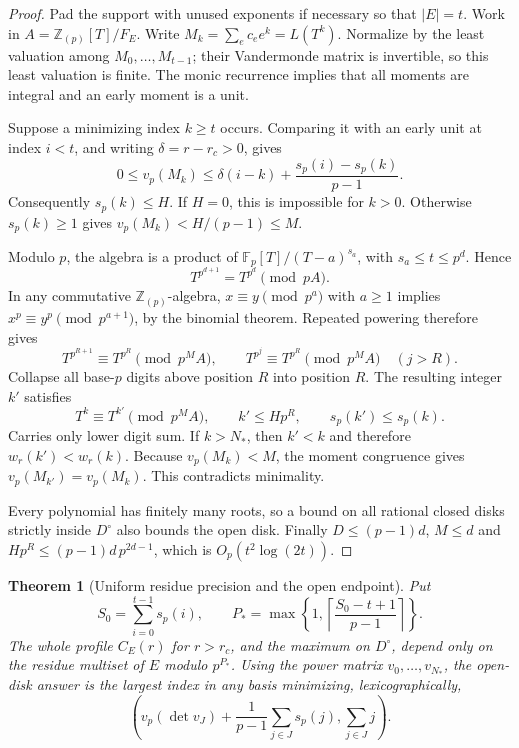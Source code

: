\documentclass[11pt,letterpaper]{article}
\newtheorem{theorem}{Theorem}[section]
\theoremstyle{definition}\newtheorem{definition}[theorem]{Definition}
\theoremstyle{remark}\newtheorem{remark}[theorem]{Remark}
\newcommand{\Z}{\mathbb Z}
\newcommand{\Fp}{\mathbb F_p}
\newcommand{\vp}{v_p}
\newcommand{\ds}{s_p}
\begin{document}
\begin{proof}
Pad the support with unused exponents if necessary so that $|E|=t$.
Work in $A=\Z_{(p)}[T]/F_E$. Write
$M_k=\sum_e c_e e^k=L(T^k)$. Normalize by the least valuation among
$M_0,\ldots,M_{t-1}$; their Vandermonde matrix is invertible, so this
least valuation is finite. The monic recurrence implies that all
moments are integral and an early moment is a unit.

Suppose a minimizing index $k\ge t$ occurs. Comparing it with an
early unit at index $i<t$, and writing $\delta=r-r_c>0$, gives
\begin{equation}\label{eq:moment-bound}
 0\le\vp(M_k)\le\delta(i-k)+\frac{\ds(i)-\ds(k)}{p-1}.
\end{equation}
Consequently $\ds(k)\le H$. If $H=0$, this is impossible for $k>0$.
Otherwise $\ds(k)\ge1$ gives
$\vp(M_k)<H/(p-1)\le M$.

Modulo $p$, the algebra is a product of
$\Fp[T]/(T-a)^{s_a}$, with $s_a\le t\le p^d$. Hence
\[
                 T^{p^{d+1}}=T^{p^d}\pmod{pA}.
\]
In any commutative $\Z_{(p)}$-algebra,
$x\equiv y\pmod{p^a}$ with $a\ge1$ implies
$x^p\equiv y^p\pmod{p^{a+1}}$, by the binomial theorem. Repeated
powering therefore gives
\[
 T^{p^{R+1}}\equiv T^{p^R}\pmod{p^M A},
 \qquad T^{p^j}\equiv T^{p^R}\pmod{p^M A}\quad(j>R).
\]
Collapse all base-$p$ digits above position $R$ into position $R$.
The resulting integer $k'$ satisfies
\[
 T^k\equiv T^{k'}\pmod{p^M A},\qquad
 k'\le Hp^R,\qquad \ds(k')\le\ds(k).
\]
Carries only lower digit sum. If $k>N_*$, then $k'<k$ and therefore
$w_r(k')<w_r(k)$. Because $\vp(M_k)<M$, the moment congruence gives
$\vp(M_{k'})=\vp(M_k)$. This contradicts minimality.

Every polynomial has finitely many roots, so a bound on all rational
closed disks strictly inside $D^\circ$ also bounds the open disk.
Finally $D\le(p-1)d$, $M\le d$ and
$Hp^R\le(p-1)d\,p^{2d-1}$, which is $O_p(t^2\log(2t))$.
\end{proof}

\begin{theorem}[Uniform residue precision and the open endpoint]\label{thm:exp-precision}
Put
\[
 S_0=\sum_{i=0}^{t-1}\ds(i),\qquad
 P_* =\max\left\{1,\left\lceil\frac{S_0-t+1}{p-1}\right\rceil\right\}.
\]
The whole profile $C_E(r)$ for $r>r_c$, and the maximum on $D^\circ$,
depend only on the residue multiset of $E$ modulo $p^{P_*}$.
Using the power matrix $v_0,\ldots,v_{N_*}$, the open-disk answer is
the largest index in any basis minimizing, lexicographically,
\begin{equation}\label{eq:open-rule}
 \left(\vp(\det v_J)+\frac1{p-1}\sum_{j\in J}\ds(j),
                     \sum_{j\in J}j\right).
\end{equation}
\end{theorem}
\end{document}
